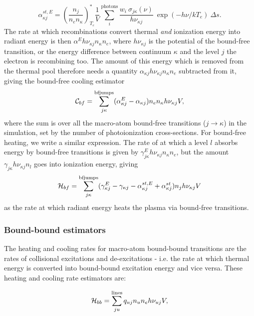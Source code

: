 \begin{equation}
\alpha_{\kappa j}^{st,E} = \left( \frac{n_j}{n_e n_\kappa} \right)^*_{T_e}
\frac{1}{V} \sum_i^{\mathrm{photons}}
\frac{w_i~\sigma_{j\kappa}({\nu})}{h \nu_{\kappa j}}
~\exp(-h\nu/kT_e)~\Delta s.
\end{equation}
The rate at which recombinations convert
thermal {\em and} ionization energy into radiant energy is then
$\alpha^E h\nu_{\kappa j} n_\kappa n_e$, where $h \nu_{\kappa j}$ is the potential of the 
bound-free transition, or the energy difference between continuum $\kappa$ and 
the level $j$ the electron is recombining too. 
The amount of this energy which is removed from the thermal pool
therefore needs a quantity $\alpha_{\kappa j} h\nu_{\kappa j} n_\kappa n_e$ subtracted from it,
giving the bound-free cooling estimator
\begin{equation}
{\cal C}_{bf} = \sum_{j\kappa}^{\mathrm{bfjumps}} (\alpha^E_{\kappa j} - \alpha_{\kappa j}) n_e n_{\kappa}h\nu_{\kappa j} V,
\end{equation}
where the sum is over all the macro-atom bound-free transitions ($j\rightarrow\kappa$) 
in the simulation, set by
the number of photoionization cross-sections. 
For bound-free heating, we write a similar expression. The rate of at which
a level $l$ absorbs energy by bound-free 
transitions is given by $\gamma^E_{j\kappa} h\nu_{\kappa j} n_\kappa n_e$,
but the amount $\gamma_{j\kappa} h \nu_{\kappa j} n_l$ goes into ionization energy, giving 
\begin{equation}
{\cal H}_{bf} = \sum_{j\kappa}^{\mathrm{bfjumps}} (\gamma^E_{\kappa j} - \gamma_{\kappa j} - \alpha^{st,E}_{\kappa j} + \alpha^{st}_{\kappa j}) n_j h \nu_{\kappa j} V
\end{equation}
as the rate at which radiant energy heats the plasma via bound-free transitions.

\subsubsection{Bound-bound estimators}
The heating and cooling rates for macro-atom bound-bound transitions are the rates of
collisional excitations and de-excitations
- i.e. the rate at which thermal energy is converted into
bound-bound excitation energy and vice versa.
These heating and cooling rate estimators are:

\begin{equation}
{\cal H}_{bb} = \sum_{ju}^{\mathrm{lines}} q_{uj} n_u n_e h \nu_{uj} V,
\end{equation}


